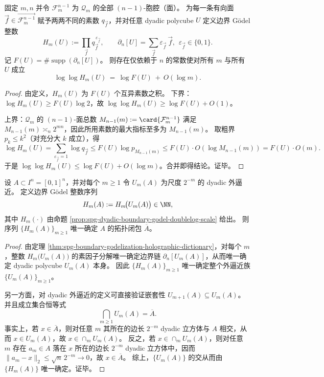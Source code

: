 \begin{proposition}\label{prop:spg-dyadic-boundary-godel-doublelog-scale}
固定 \(m,n\) 并令 \(\mathcal F_{m}^{n-1}\) 为 \(\mathcal Q_m\) 的全部 \((n-1)\)-胞腔（面）。
为每一条有向面 \(\vec f\in\overrightarrow{\mathcal F_m^{n-1}}\) 赋予两两不同的素数 \(q_{\vec f}\)，并对任意 dyadic polycube \(U\) 定义边界 Gödel 整数
\[
H_m(U):=\prod_{\vec f} q_{\vec f}^{\,\varepsilon_{\vec f}},
\qquad
\partial_n[U]=\sum_{\vec f}\varepsilon_{\vec f}\,\vec f,\ \ \varepsilon_{\vec f}\in\{0,1\}.
\]
记 \(F(U)=\#\operatorname{supp}(\partial_n[U])\)。
则存在仅依赖于 \(n\) 的常数使对所有 \(m\) 与所有 \(U\) 成立
\[
\log\log H_m(U)\ =\ \log F(U)\ +\ O(\log m).
\]
\end{proposition}
\begin{proof}
由定义，\(H_m(U)\) 为 \(F(U)\) 个互异素数之积。
下界：\(\log H_m(U)\ge F(U)\log 2\)，故 \(\log\log H_m(U)\ge \log F(U)+O(1)\)。
\par
上界：\(\mathcal Q_m\) 的 \((n-1)\)-面总数 \(M_{n-1}(m):=\card{\mathcal F_m^{n-1}}\) 满足 \(M_{n-1}(m)\asymp_n 2^{mn}\)，因此所用素数的最大指标至多为 \(M_{n-1}(m)\)。
取粗界 \(p_k\le k^2\)（对充分大 \(k\) 成立），得
\[
\log H_m(U)
=\sum_{\varepsilon_{\vec f}=1}\log q_{\vec f}
\le F(U)\log p_{M_{n-1}(m)}
\le F(U)\cdot O(\log M_{n-1}(m))
=F(U)\cdot O(m).
\]
于是 \(\log\log H_m(U)\le \log F(U)+O(\log m)\)。合并即得结论。证毕。
\end{proof}

\begin{theorem}\label{thm:spg-boundary-godel-sequence-determines-closure}
设 \(A\subset I^n=[0,1]^n\)，并对每个 \(m\ge 1\) 令 \(U_m(A)\) 为尺度 \(2^{-m}\) 的 dyadic 外逼近。
定义边界 Gödel 整数序列
\[
H_m(A):=H_m\!\bigl(U_m(A)\bigr)\in\NN,
\]
其中 \(H_m(\cdot)\) 由命题 \ref{prop:spg-dyadic-boundary-godel-doublelog-scale} 给出。
则序列 \(\{H_m(A)\}_{m\ge 1}\) 唯一确定 \(A\) 的拓扑闭包 \(\overline A\)。
\end{theorem}
\begin{proof}
由定理 \ref{thm:spg-boundary-godelization-holographic-dictionary}，对每个 \(m\)，整数 \(H_m\!\bigl(U_m(A)\bigr)\) 的素因子分解唯一确定边界链 \(\partial_n[U_m(A)]\)，从而唯一确定 dyadic polycube \(U_m(A)\) 本身。
因此 \(\{H_m(A)\}_{m\ge 1}\) 唯一确定整个外逼近族 \(\{U_m(A)\}_{m\ge 1}\)。
\par
另一方面，对 dyadic 外逼近的定义可直接验证嵌套性 \(U_{m+1}(A)\subseteq U_m(A)\)。
并且成立集合恒等式
\[
\bigcap_{m\ge 1}U_m(A)=\overline A.
\]
事实上，若 \(x\in\overline A\)，则对任意 \(m\) 其所在的边长 \(2^{-m}\) dyadic 立方体与 \(A\) 相交，从而 \(x\in U_m(A)\)，故 \(x\in\cap_m U_m(A)\)。
反之，若 \(x\in\cap_m U_m(A)\)，则对任意 \(m\) 存在 \(a_m\in A\) 落在 \(x\) 所在的边长 \(2^{-m}\) dyadic 立方体中，因而 \(\|a_m-x\|_2\le \sqrt n\,2^{-m}\to 0\)，故 \(x\in\overline A\)。
综上，\(\{U_m(A)\}\) 的交从而由 \(\{H_m(A)\}\) 唯一确定。证毕。
\end{proof}


